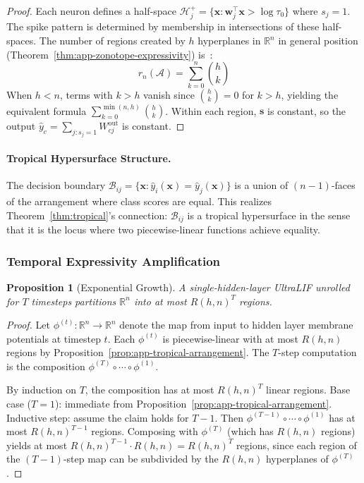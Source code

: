 \documentclass{article}
\theoremstyle{plain}
\newtheorem{proposition}[theorem]{Proposition}
\theoremstyle{definition}
\theoremstyle{remark}
\begin{document}
\begin{proof}
Each neuron defines a half-space $\mathcal{H}_j^+ = \{\mathbf{x} : \mathbf{w}_j^\top \mathbf{x} > \log\tau_0\}$ where $s_j = 1$. The spike pattern is determined by membership in intersections of these half-spaces. The number of regions created by $h$ hyperplanes in $\mathbb{R}^n$ in general position (Theorem~\ref{thm:app-zonotope-expressivity}) is~\citep{zaslavsky1975}:
\[
r_n(\mathcal{A}) = \sum_{k=0}^{n} \binom{h}{k}
\]
When $h < n$, terms with $k > h$ vanish since $\binom{h}{k} = 0$ for $k > h$, yielding the equivalent formula $\sum_{k=0}^{\min(n,h)} \binom{h}{k}$. Within each region, $\mathbf{s}$ is constant, so the output $\hat{y}_c = \sum_{j: s_j=1} W^{\mathrm{out}}_{cj}$ is constant.
\end{proof}

\paragraph{Tropical Hypersurface Structure.} The decision boundary $\mathcal{B}_{ij} = \{\mathbf{x} : \hat{y}_i(\mathbf{x}) = \hat{y}_j(\mathbf{x})\}$ is a union of $(n{-}1)$-faces of the arrangement where class scores are equal. This realizes Theorem~\ref{thm:tropical}'s connection: $\mathcal{B}_{ij}$ is a tropical hypersurface in the sense that it is the locus where two piecewise-linear functions achieve equality.

\subsubsection{Temporal Expressivity Amplification}
\label{app:temporal-expressivity}

\begin{proposition}[Exponential Growth]
\label{prop:app-temporal-expressivity}
A single-hidden-layer UltraLIF unrolled for $T$ timesteps partitions $\mathbb{R}^n$ into at most $R(h,n)^T$ regions.
\end{proposition}

\begin{proof}
Let $\phi^{(t)}: \mathbb{R}^n \to \mathbb{R}^n$ denote the map from input to hidden layer membrane potentials at timestep $t$. Each $\phi^{(t)}$ is piecewise-linear with at most $R(h,n)$ regions by Proposition~\ref{prop:app-tropical-arrangement}. The $T$-step computation is the composition $\phi^{(T)} \circ \cdots \circ \phi^{(1)}$.

By induction on $T$, the composition has at most $R(h,n)^T$ linear regions. Base case ($T=1$): immediate from Proposition~\ref{prop:app-tropical-arrangement}. Inductive step: assume the claim holds for $T-1$. Then $\phi^{(T-1)} \circ \cdots \circ \phi^{(1)}$ has at most $R(h,n)^{T-1}$ regions. Composing with $\phi^{(T)}$ (which has $R(h,n)$ regions) yields at most $R(h,n)^{T-1} \cdot R(h,n) = R(h,n)^T$ regions, since each region of the $(T-1)$-step map can be subdivided by the $R(h,n)$ hyperplanes of $\phi^{(T)}$.
\end{proof}
\end{document}
